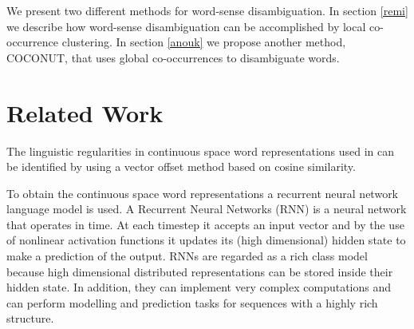 \documentclass[11pt]{article}
\begin{document}
We present two different methods for word-sense disambiguation. In section \ref{remi} we describe how word-sense disambiguation can be accomplished by local co-occurrence clustering. In section \ref{anouk} we propose another method, COCONUT, that uses global co-occurrences to disambiguate words.

\section{Related Work}
The linguistic regularities in continuous space word representations used in \cite{Mikolov:13} can be identified by using a vector offset method based on cosine similarity. 

To obtain the continuous space word representations a recurrent neural network language model is used. A Recurrent Neural Networks (RNN) is a neural network that operates in time. At each timestep it accepts an input vector and by the use of nonlinear activation functions it updates its (high dimensional) hidden state to make a prediction of the output. RNNs are regarded as a rich class model because high dimensional distributed representations can be stored inside their hidden state. In addition, they can implement very complex computations and can perform modelling and prediction tasks for sequences with a highly rich structure.
\end{document}
